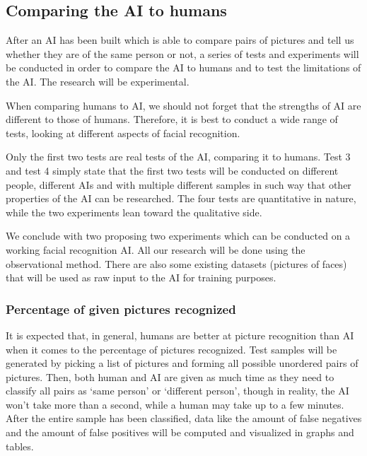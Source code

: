 \documentclass[12pt, titlepage]{article}
\begin{document}
    \subsection{Comparing the AI to humans}
    After an AI has been built which is able to compare pairs of pictures and tell us whether they are of the same person or not, a series of tests and experiments will be conducted in order to compare the AI to humans and to test the limitations of the AI. The research will be experimental.
    
    \bigskip
    When comparing humans to AI, we should not forget that the strengths of AI are different to those of humans. Therefore, it is best to conduct a wide range of tests, looking at different aspects of facial recognition.
    
    \bigskip
    Only the first two tests are real tests of the AI, comparing it to humans. Test 3 and test 4 simply state that the first two tests will be conducted on different people, different AIs and with multiple different samples in such way that other properties of the AI can be researched. The four tests are quantitative in nature, while the two experiments lean toward the qualitative side.
    
    \bigskip
    We conclude with two proposing two experiments which can be conducted on a working facial recognition AI. All our research will be done using the observational method. There are also some existing datasets (pictures of faces) that will be used as raw input to the AI for training purposes.
    
    \subsubsection{Percentage of given pictures recognized}
    It is expected that, in general, humans are better at picture recognition than AI when it comes to the percentage of pictures recognized. Test samples will be generated by picking a list of pictures and forming all possible unordered pairs of pictures. Then, both human and AI are given as much time as they need to classify all pairs as ‘same person’ or ‘different person’, though in reality, the AI won't take more than a second, while a human may take up to a few minutes. After the entire sample has been classified, data like the amount of false negatives and the amount of false positives will be computed and visualized in graphs and tables.
    
\end{document}
